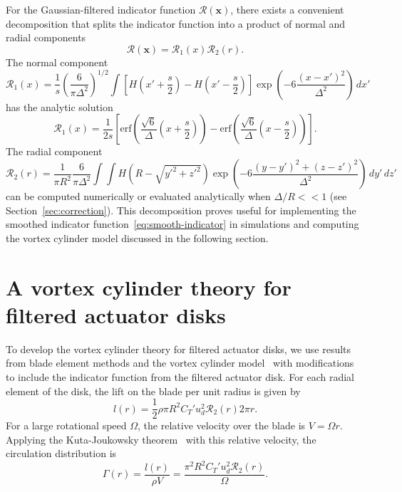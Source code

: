\documentclass{article}
\begin{document}
For the Gaussian-filtered indicator function $\mathcal{R}(\mathbf{x})$, there exists a convenient decomposition that splits the indicator function into a product of normal and radial components
\begin{equation}
\mathcal{R}(\mathbf{x}) = \mathcal{R}_1(x) \mathcal{R}_2(r).
\end{equation}
The normal component 
\begin{equation}
\mathcal{R}_1(x) = \frac{1}{s} \left(\frac{6}{\pi \Delta^2}\right)^{1/2} \int \left[ H\left(x'+\frac{s}{2}\right) - H\left(x' - \frac{s}{2}\right) \right] \exp \left( -6\frac{(x-x')^2}{\Delta^2} \right) \, d x' 
\end{equation} 
has the analytic solution
\begin{equation}
\mathcal{R}_1(x) = \frac{1}{2s}\left[\mathrm{erf}\left(\frac{\sqrt{6}}{\Delta}\left(x+\frac{s}{2}\right) \right) - \mathrm{erf}\left(\frac{\sqrt{6}}{\Delta}\left(x-\frac{s}{2}\right) \right)\right].
\end{equation}
The radial component
 \begin{equation} 
 \label{eq:smoothed-indicator-2}
 \mathcal{R}_2(r) = \frac{1}{\pi R^2}\frac{6}{\pi \Delta^2} \int \! \! \! \int H\left(R - \sqrt{y'^2+z'^2}\right) \exp \left( -6\frac{(y-y')^2 + (z-z')^2}{\Delta^2} \right) \, d y' \, d z'
\end{equation}
can be computed numerically or evaluated analytically when $\Delta/R <<1$ (see Section~\ref{sec:correction}). This decomposition proves useful for implementing the smoothed indicator function~\eqref{eq:smooth-indicator} in simulations and computing the vortex cylinder model discussed in the following section.

\section{A vortex cylinder theory for filtered actuator disks}
\label{sec:filtered-adm-theory}
To develop the vortex cylinder theory for filtered actuator disks, we use results from blade element methods and the vortex cylinder model~\cite{Burton2011a} with modifications to include the indicator function from the filtered actuator disk. For each radial element of the disk, the lift on the blade per unit radius is given by
\begin{equation}
l(r) = \frac{1}{2}\rho \pi R^2 C_T' u_d^2 \mathcal{R}_2(r) 2 \pi r.
\end{equation}
For a large rotational speed $\Omega$, the relative velocity over the blade is $V = \Omega r$. 
Applying the Kuta-Joukowsky theorem~\cite{Milne-Thomson1973a} with this relative velocity, the circulation distribution is
\begin{equation}
\Gamma(r) = \frac{l(r)}{\rho V} = \frac{\pi^2 R^2 C_T' u_d^2 \mathcal{R}_2(r)}{\Omega}.
\end{equation}
\end{document}
